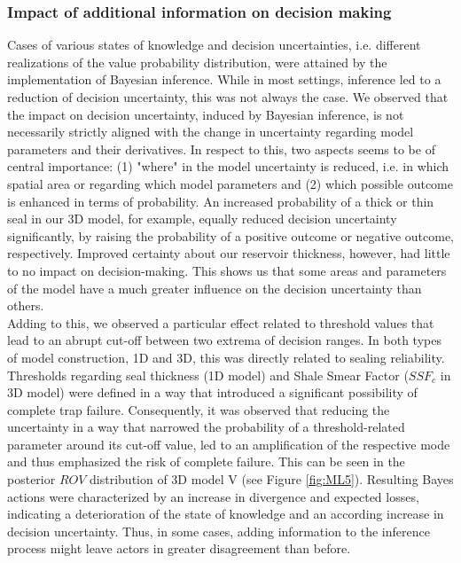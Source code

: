 	\subsubsection{Impact of additional information on decision making}
	Cases of various states of knowledge and decision uncertainties, i.e. different realizations of the value probability distribution, were attained by the implementation of Bayesian inference. While in most settings, inference led to a reduction of decision uncertainty, this was not always the case. We observed that the impact on decision uncertainty, induced by Bayesian inference, is not necessarily strictly aligned with the change in uncertainty regarding model parameters and their derivatives. In respect to this, two aspects seems to be of central importance: (1) "where" in the model uncertainty is reduced, i.e. in which spatial area or regarding which model parameters and (2) which possible outcome is enhanced in terms of probability. An increased probability of a thick or thin seal in our 3D model, for example, equally reduced decision uncertainty significantly, by raising the probability of a positive outcome or negative outcome, respectively. Improved certainty about our reservoir thickness, however, had little to no impact on decision-making. This shows us that some areas and parameters of the model have a much greater influence on the decision uncertainty than others.\\
	Adding to this, we observed a particular effect related to threshold values that lead to an abrupt cut-off between two extrema of decision ranges. In both types of model construction, 1D and 3D, this was directly related to sealing reliability. Thresholds regarding seal thickness (1D model) and Shale Smear Factor ($SSF_c$ in 3D model) were defined in a way that introduced a significant possibility of complete trap failure. Consequently, it was observed that reducing the uncertainty in a way that narrowed the probability of a threshold-related parameter around its cut-off value, led to an amplification of the respective mode and thus emphasized the risk of complete failure. This can be seen in the posterior $ROV$ distribution of 3D model V (see Figure \ref{fig:ML5}). Resulting Bayes actions were characterized by an increase in divergence and expected losses, indicating a deterioration of the state of knowledge and an according increase in decision uncertainty. Thus, in some cases, adding information to the inference process might leave actors in greater disagreement than before.
